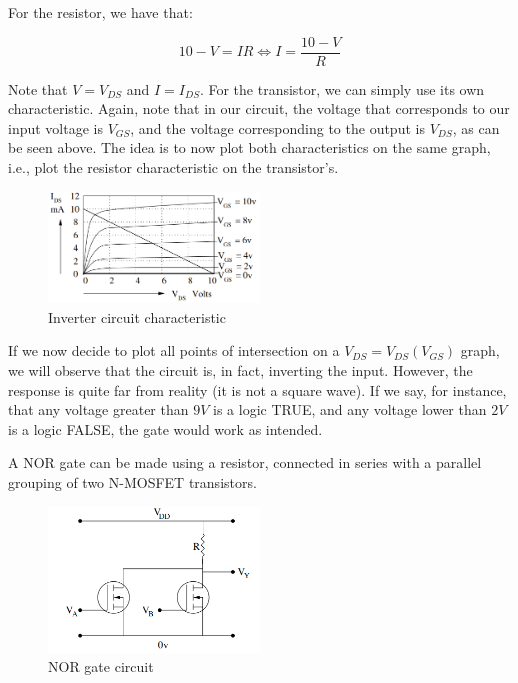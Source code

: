 \documentclass{article}
\begin{document}
For the resistor, we have that:



\[ 10 - V = IR \iff I = \frac{10 - V}{R} \]

Note that $V = V_{DS}$ and $I = I_{DS}$. For the transistor, we can simply use its own characteristic. Again, note that in our circuit, the voltage that corresponds to our input voltage is $V_{GS}$, and the voltage corresponding to the output is $V_{DS}$, as can be seen above. The idea is to now plot both characteristics on the same graph, i.e., plot the resistor characteristic on the transistor's.

\begin{figure}[h]
    \centering
    \includegraphics[width = 0.5\textwidth]{images/Screenshot 2024-04-06 112807.png}
    \caption{Inverter circuit characteristic}
    \label{fig:enter-label}
\end{figure}

If we now decide to plot all points of intersection on a $V_{DS} = V_{DS}(V_{GS})$ graph, we will observe that the circuit is, in fact, inverting the input. However, the response is quite far from reality (it is not a square wave). If we say, for instance, that any voltage greater than $9V$ is a logic TRUE, and any voltage lower than $2V$ is a logic FALSE, the gate would work as intended.

\begin{proposition}
    A NOR gate can be made using a resistor, connected in series with a parallel grouping of two N-MOSFET transistors.
\end{proposition}

\begin{figure}[h]
    \centering
    \includegraphics[width = 0.5\textwidth]{images/Screenshot 2024-04-06 113143.png}
    \caption{NOR gate circuit}
    \label{fig:enter-label}
\end{figure}
\end{document}
